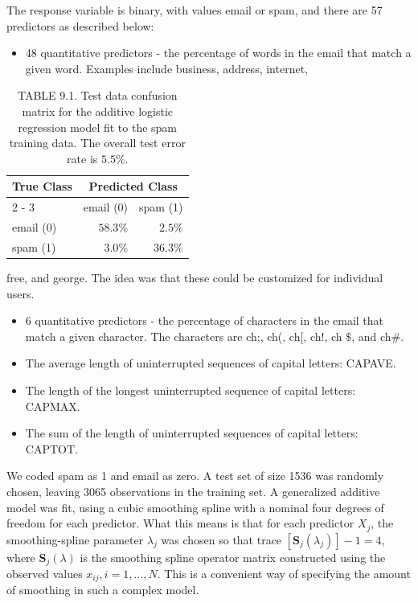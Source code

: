 \documentclass[10pt]{article}
\begin{document}
The response variable is binary, with values email or spam, and there are 57 predictors as described below:

\begin{itemize}
  \item 48 quantitative predictors - the percentage of words in the email that match a given word. Examples include business, address, internet,
\end{itemize}

\begin{table}[h]
\begin{center}
\captionsetup{labelformat=empty}
\caption{TABLE 9.1. Test data confusion matrix for the additive logistic regression model fit to the spam training data. The overall test error rate is $5.5 \%$.}
\begin{tabular}{l|rr}
\hline
\multirow{2}{*}{True Class} & \multicolumn{2}{|c}{Predicted Class} \\
\cline { 2 - 3 }
 & email (0) & spam (1) \\
\hline
email (0) & $58.3 \%$ & $2.5 \%$ \\
spam (1) & $3.0 \%$ & $36.3 \%$ \\
\hline
\end{tabular}
\end{center}
\end{table}

free, and george. The idea was that these could be customized for individual users.

\begin{itemize}
  \item 6 quantitative predictors - the percentage of characters in the email that match a given character. The characters are ch;, ch(, ch[, ch!, ch $\$$, and ch\#.
  \item The average length of uninterrupted sequences of capital letters: CAPAVE.
  \item The length of the longest uninterrupted sequence of capital letters: CAPMAX.
  \item The sum of the length of uninterrupted sequences of capital letters: CAPTOT.
\end{itemize}

We coded spam as 1 and email as zero. A test set of size 1536 was randomly chosen, leaving 3065 observations in the training set. A generalized additive model was fit, using a cubic smoothing spline with a nominal four degrees of freedom for each predictor. What this means is that for each predictor $X_{j}$, the smoothing-spline parameter $\lambda_{j}$ was chosen so that trace $\left[\mathbf{S}_{j}\left(\lambda_{j}\right)\right]-1=4$, where $\mathbf{S}_{j}(\lambda)$ is the smoothing spline operator matrix constructed using the observed values $x_{i j}, i=1, \ldots, N$. This is a convenient way of specifying the amount of smoothing in such a complex model.
\end{document}
